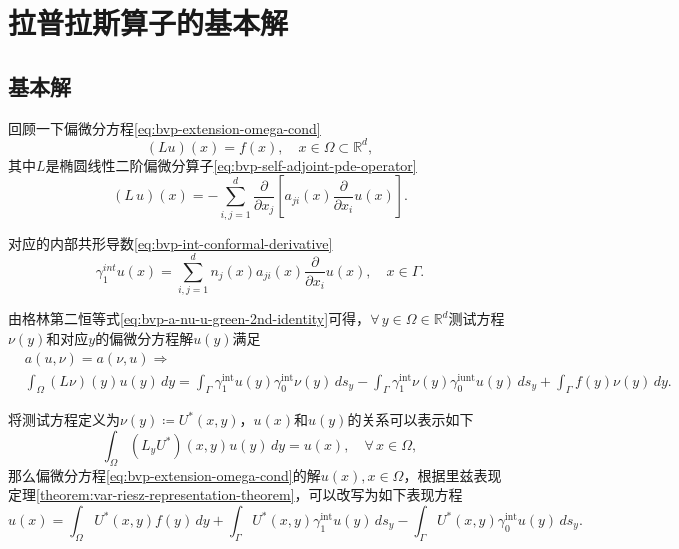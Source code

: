 \section{拉普拉斯算子的基本解}
\label{sec:bvp-laplace-fund-solutions}

\subsection{基本解}
\label{sec:bvp-fund-solutions}

回顾一下偏微分方程\eqref{eq:bvp-extension-omega-cond}
\begin{equation*}
  \left( L u \right)(x) = f(x), \quad x \in \Omega \subset \mathbb{R}^d,
\end{equation*}
其中$L$是椭圆线性二阶偏微分算子\eqref{eq:bvp-self-adjoint-pde-operator}
\begin{equation*}
  \left( L \, u \right)(x) = - \sum_{i,j=1}^d \frac{\partial}{\partial x_j} \left[ a_{ji} (x) \frac{\partial}{\partial x_i} u(x)\right].
\end{equation*}

对应的内部共形导数\eqref{eq:bvp-int-conformal-derivative}
\begin{equation*}
  \gamma_1^{int}u(x) =
\sum_{i,j=1}^{d} n_j(x) a_{ji} \left( x \right) \frac{\partial}{\partial x_{i}} u \left( x \right)
  , \quad x \in \Gamma.
\end{equation*}

由格林第二恒等式\eqref{eq:bvp-a-nu-u-green-2nd-identity}可得，$\forall \, y \in \Omega \in \mathbb{R}^d$测试方程$\nu(y)$和对应$y$的偏微分方程解$u(y)$满足
\begin{equation*}
  \begin{split}
    &a(u,\nu) = a(\nu,u) \Rightarrow \\
    &\int_{\Omega} (L \nu)(y) u(y) \, dy =
    \int_{\Gamma} \gamma_{1}^{\text{int}} u(y) \gamma_{0}^{\text{int}} \nu(y) \, d s_y
    - \int_{\Gamma} \gamma_{1}^{\text{int}} \nu(y) \gamma_{0}^{\text{iunt}} u(y) \, d s_y
    + \int_{\Gamma} f(y) \nu(y) \, dy.
  \end{split}
\end{equation*}

将测试方程定义为$\nu(y) \coloneqq U^{*}(x,y)$，$u(x)$和$u(y)$的关系可以表示如下
\begin{equation*}
  \int_{\Omega} \left( L_{y} U^{*} \right) (x,y) u(y) \, dy = u(x), \quad \forall \, x \in \Omega,
\end{equation*}
那么偏微分方程\eqref{eq:bvp-extension-omega-cond}的解$u(x), x \in \Omega$，根据里兹表现定理\ref{theorem:var-riesz-representation-theorem}，可以改写为如下表现方程
\begin{equation}
  \label{eq:bvp-fund-var-ux-uy}
  u(x) = \int_{\Omega} U^{*}(x,y) f(y) \, dy
  + \int_{\Gamma} U^{*}(x,y) \gamma_{1}^{\text{int}} u(y) \, d s_y
  - \int_{\Gamma} U^{*}(x,y) \gamma_{0}^{\text{int}} u(y) \, d s_y.
\end{equation}

